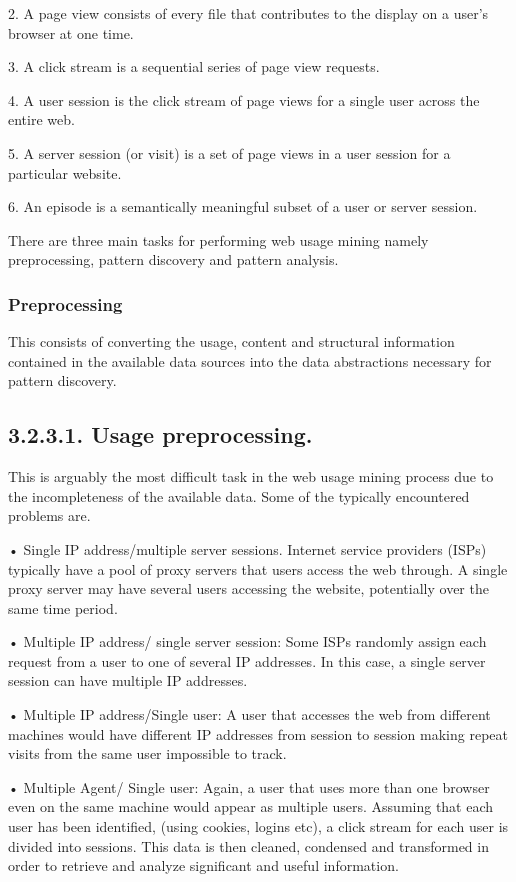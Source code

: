 \documentclass{article}
\begin{document}
2.	A page view consists of every file that contributes to the display on a user’s browser at one time.

3.	A click stream is a sequential series of page view requests.

4.	A user session is the click stream of page views for a single user across the entire web.

5.	A server session (or visit) is a set of page views in a user session for a particular website.

6.	An episode is a semantically meaningful subset of a user or server session.

There are three main tasks for performing web usage mining namely preprocessing, pattern discovery and pattern analysis.
\subsubsection{ Preprocessing}This consists of converting the usage, content and structural information contained in the available data sources into the data abstractions necessary for pattern discovery.
\subsection*{\small{3.2.3.1. Usage preprocessing.}}  This is arguably the most difficult task in the web usage mining process due to the incompleteness of the available data. 
Some of the typically encountered problems are.

•	Single IP address/multiple server sessions. Internet service providers (ISPs) typically have a pool of proxy servers that users access the web through. A single proxy server may have several users accessing the website, potentially over the same time period.
 
•	Multiple IP address/ single server session:
Some ISPs randomly assign each request from a user to one of several IP addresses. In this case, a single server session can have multiple IP addresses.

•	Multiple IP address/Single user:
A user that accesses the web from different machines would have different IP addresses from session to session making repeat visits from the same user impossible to track.

•	Multiple Agent/ Single user:
Again, a user that uses more than one browser even on the same machine would appear as multiple users. Assuming that each user has been identified, (using cookies,           logins etc), a click stream for each user is divided into sessions. This data is then cleaned, condensed and transformed in order to retrieve and analyze significant and useful information. 
\end{document}
